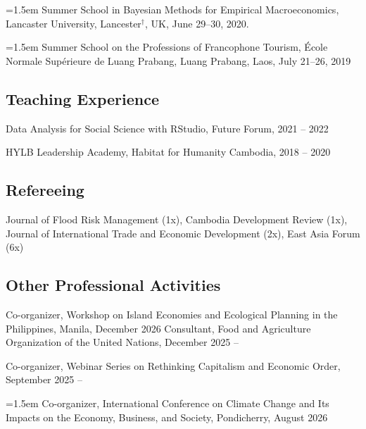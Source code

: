 \documentclass[10pt,a4paper]{article}
\begin{document}
\hangindent=1.5em
Summer School in Bayesian Methods for Empirical Macroeconomics, Lancaster University, Lancester$^\dag$, UK, June 29--30, 2020. 

\hangindent=1.5em
Summer School on the Professions of Francophone Tourism, École Normale Supérieure de Luang Prabang, Luang Prabang, Laos, July 21–26, 2019


\subsection*{Teaching Experience}

Data Analysis for Social Science with RStudio, Future Forum, 2021 -- 2022

HYLB Leadership Academy, Habitat for Humanity Cambodia, 2018 -- 2020

\subsection*{Refereeing}

Journal of Flood Risk Management (1x), Cambodia Development Review (1x), Journal of International Trade and Economic Development (2x), East Asia Forum (6x)


\subsection*{Other Professional Activities}

Co-organizer, Workshop on Island Economies and Ecological Planning in the Philippines, Manila, December 2026
Consultant, Food and Agriculture Organization of the United Nations, December 2025 -- 

Co-organizer, Webinar Series on Rethinking Capitalism and Economic Order, September 2025 --

\hangindent=1.5em
Co-organizer, International Conference on Climate Change and Its Impacts on the Economy, Business, and Society, Pondicherry, August 2026 
\end{document}
